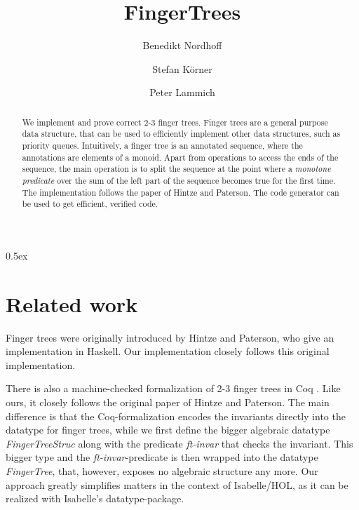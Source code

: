 \documentclass[11pt,a4paper]{article}
\begin{document}
\title{FingerTrees}
\author{Benedikt Nordhoff \and Stefan K\"orner \and Peter Lammich}


\maketitle

\begin{abstract}
  We implement and prove correct 2-3 finger trees.
  Finger trees are a general purpose data structure, that can be used to
  efficiently implement other data structures, such as priority queues.
  Intuitively, a finger tree is an annotated sequence, where the annotations are
  elements of a monoid. Apart from operations to access the ends of the sequence,
  the main operation is to split the sequence at the point where a 
  {\em monotone predicate} over the sum of the left part of the sequence 
  becomes true for the first time.
  The implementation follows the paper of Hintze and Paterson\cite{HiPa06}.
  The code generator can be used to get efficient, verified code.
\end{abstract}

\tableofcontents

\parindent 0pt\parskip 0.5ex




\section{Related work}
Finger trees were originally introduced by Hintze and Paterson\cite{HiPa06},
who give an implementation in Haskell. Our implementation closely follows
this original implementation.

There is also a machine-checked formalization of 2-3 finger trees in Coq \cite{So07}.
Like ours, it closely follows the original paper of Hintze and Paterson.
The main difference is that the Coq-formalization encodes the invariants directly into
the datatype for finger trees, while we first define the bigger algebraic datatype {\em FingerTreeStruc} 
along with the predicate {\em ft-invar} that checks the invariant. 
This bigger type and the {\em ft-invar}-predicate is then wrapped into the 
datatype {\em FingerTree}, that, however, exposes no algebraic structure any more. 
Our approach greatly simplifies matters in the context of Isabelle/HOL, as it can be 
realized with Isabelle's datatype-package.



\end{document}
